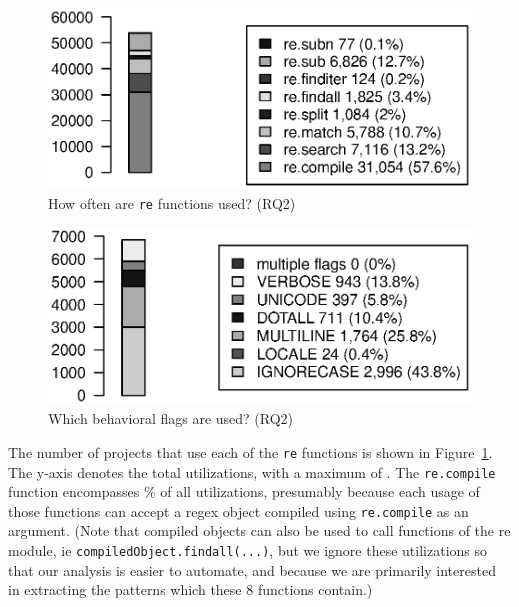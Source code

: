\begin{figure}[tb]
\centering
\includegraphics[width=\columnwidth]{../analysis_output/partFunctions.eps}
\vspace{-6pt}
\caption{How often are  {\tt re} functions used? (RQ2)}
\vspace{-6pt}
\label{fig:partFunctions}
\end{figure}

\begin{figure}[tb]
\centering
\includegraphics[width=0.9\columnwidth]{../analysis_output/partFlags.eps}
\vspace{-6pt}
\caption{Which behavioral flags are used? (RQ2)}
\vspace{-6pt}
\label{fig:partFlags}
\end{figure}



The number of projects that use each of the {\tt re} functions is shown in Figure~\ref{fig:partFunctions}.  The y-axis denotes the total utilizations, with a maximum of . The {\tt re.compile} function encompasses \% of all utilizations, presumably because each usage of those functions can accept a regex object compiled using {\tt re.compile} as an argument. (Note that compiled objects can also be used to call functions of the re module, ie {\tt compiledObject.findall(...)}, but we ignore these utilizations so that our analysis is easier to automate, and because we are primarily interested in extracting the patterns which these 8 functions contain.)

